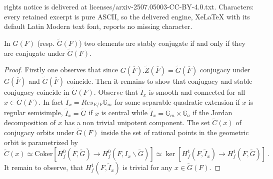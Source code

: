 \documentclass[10pt,a4paper]{amsart}
\def\Fbar{\overline{F}}
\def\GM{\mathbb G}
\def\G{G}
\def\bsl{\backslash}
\def\coker{\mathrm{Coker}}
\def\ptf{~.}
\def\tC{{\widetilde C}}
\def\tG{{\widetilde G}}
\def\tI{{\widetilde I}}
\def\tZ{{\widetilde Z}}
\begin{document}
rights notice is delivered at licenses/arxiv-2507.05003-CC-BY-4.0.txt. Characters: every retained excerpt is pure ASCII, so the delivered engine, XeLaTeX with its default Latin Modern text font, reports no missing character.
\begin{lemma} \label{tg}
In $\G(F)$ (resp. $\tG(F)$) two elements are stably conjugate if and only if they are
conjugate under $\tG(F)$.
\end{lemma}

\begin{proof}
Firstly one observes that since $\G(\Fbar).\tZ(\Fbar)=\tG(\Fbar)$
conjugacy under $\G(\Fbar)$ and $\tG(\Fbar)$ coincide.
Then it remains to show that conjugacy and stable conjugacy coincide
in $\tG(F)$.  Observe that $\tI_x$ 
is smooth and connected for all $x\in\tG(F)$. In fact 
$\tI_x=Res_{E/F}\GM_m$ for some separable quadratic extension
if $x$ is regular semisimple, $\tI_x=\tG$ if $x$ is central while
 $\tI_x=\GM_m\times\GM_a$ if the Jordan decomposition of $x$ has a non trivial unipotent component.
The set $\tC(x)$ of conjugacy orbits under $\tG(F)$ inside the set
of  rational points in the geometric orbit is parametrized by
 $$\tC(x)\simeq\coker[H^0_{f}(F,\tG)\to H^0_{f}(F,I_x\bsl\tG)]
\simeq\ker[H^1_{f}(F,\tI_x)\to H^1_{f}(F,\tG)]\ptf$$
It remain to observe, that  $H^1_{f}(F,\tI_x)$ is trivial for any $x\in\tG(F)$. 
\end{proof}
\end{document}
